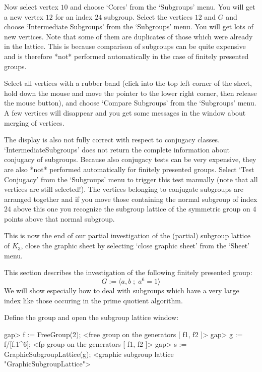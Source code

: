 Now select vertex $10$ and choose `Cores' from the `Subgroups' menu.
You will get a new vertex $12$ for  an index $24$ subgroup. Select the
vertices $12$   and $G$ and choose  `Intermediate  Subgroups' from the
`Subgroups' menu. You will get lots  of new vertices. Note that some
of them  are duplicates of  those which  were already  in the lattice. 
This is because comparison of subgroups can  be quite expensive and is
therefore   *not* performed automatically    in  the case of  finitely
presented groups.

Select all vertices with a rubber band (click into the top left corner
of  the sheet, hold down  the mouse and  move the pointer to the lower
right corner, then  release  the mouse  button), and   choose 
`Compare Subgroups' from the `Subgroups' menu.  A few vertices will disappear
and  you get  some  messages in  the {\GAP}  window   about merging of
vertices.

The  display   is also  not  fully correct  with  respect to conjugacy
classes.    `IntermediateSubgroups'    does  not  return  the complete
information about conjugacy of subgroups. Because also conjugacy tests
can be very expensive, they are also *not* performed automatically for
finitely   presented   groups.  Select    `Test  Conjugacy'  from  the
`Subgroups'  menu to  trigger  this  test  manually (note  that  all
vertices are still selected!).   The vertices belonging  to  conjugate
subgroups are  arranged together and  if you move those containing the
normal subgroup  of index $24$    above this  one you  recognize   the
subgroup lattice   of the symmetric  group on   $4$ points above  that
normal subgroup.

This is  now  the end  of our partial   investigation of the (partial)
subgroup lattice of $K_3$, close the graphic sheet by selecting `close
graphic sheet' from the `Sheet' menu.



This section describes the investigation of the following finitely presented
group: 
$$ G := \langle a, b \; ; \; a^6 = 1 \rangle $$
We will show especially how to deal with subgroups which have a very large
index like those occuring in the prime quotient algorithm.

Define the group and open the subgroup lattice window:

\begintt
gap> f := FreeGroup(2);
<free group on the generators [ f1, f2 ]>
gap> g := f/[f.1^6];
<fp group on the generators [ f1, f2 ]>
gap> s := GraphicSubgroupLattice(g);
<graphic subgroup lattice "GraphicSubgroupLattice">
\endtt


